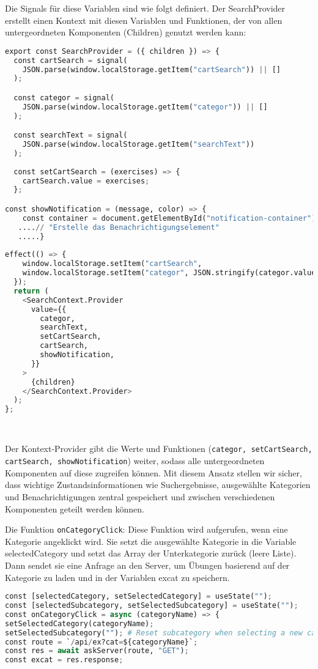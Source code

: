 Die Signals für diese Variablen sind wie folgt definiert. Der SearchProvider erstellt einen Kontext mit diesen Variablen und Funktionen, der von allen untergeordneten Komponenten (Children) genutzt werden kann:
    
\begin{lstlisting}[language=Python]
export const SearchProvider = ({ children }) => {
  const cartSearch = signal(
    JSON.parse(window.localStorage.getItem("cartSearch")) || []
  );

  const categor = signal(
    JSON.parse(window.localStorage.getItem("categor")) || []
  );

  const searchText = signal(
    JSON.parse(window.localStorage.getItem("searchText"))
  );
  
  const setCartSearch = (exercises) => {
    cartSearch.value = exercises;
  };

const showNotification = (message, color) => {
    const container = document.getElementById("notification-container");
   ....// "Erstelle das Benachrichtigungselement"
   .....}
   
effect(() => {
    window.localStorage.setItem("cartSearch", 
    window.localStorage.setItem("categor", JSON.stringify(categor.value));
  });
  return (
    <SearchContext.Provider
      value={{
        categor,
        searchText,
        setCartSearch,
        cartSearch,
        showNotification,
      }}
    >
      {children}
    </SearchContext.Provider>
  );
};




 \end{lstlisting}  
Der Kontext-Provider gibt die Werte und Funktionen (\texttt{categor, setCartSearch, cartSearch, showNotification}) weiter, sodass alle untergeordneten Komponenten auf diese zugreifen können.
Mit diesem Ansatz stellen wir sicher, dass wichtige Zustandsinformationen wie Suchergebnisse, ausgewählte Kategorien und Benachrichtigungen zentral gespeichert und zwischen verschiedenen Komponenten geteilt werden können. 




Die Funktion \texttt{onCategoryClick}: Diese Funktion wird aufgerufen, wenn eine Kategorie angeklickt wird. Sie setzt die ausgewählte Kategorie in die Variable selectedCategory und setzt das Array der Unterkategorie zurück (leere Liste). Dann sendet sie eine Anfrage an den Server, um Übungen basierend auf der Kategorie zu laden und in der Variablen excat zu speichern.

\begin{lstlisting}[language=Python]
const [selectedCategory, setSelectedCategory] = useState("");
const [selectedSubcategory, setSelectedSubcategory] = useState("");
const onCategoryClick = async (categoryName) => {
setSelectedCategory(categoryName);
setSelectedSubcategory(""); # Reset subcategory when selecting a new category
const route = `/api/ex?cat=${categoryName}`;
const res = await askServer(route, "GET");
const excat = res.response;
    
\end{lstlisting}

